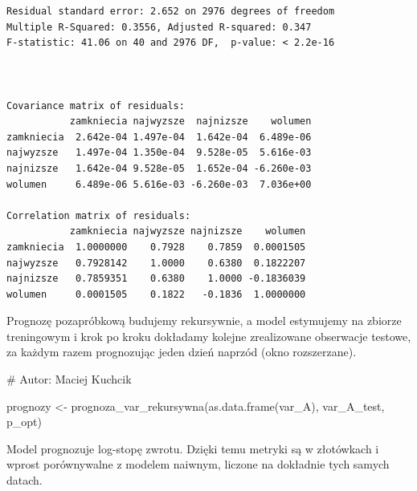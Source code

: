 \documentclass[
  polish,
  letterpaper,
  DIV=11,
  numbers=noendperiod]{scrartcl}
\newenvironment{Shaded}{\begin{snugshade}}{\end{snugshade}}
\newcommand{\CommentTok}[1]{\textcolor[rgb]{0.37,0.37,0.37}{#1}}
\newcommand{\FunctionTok}[1]{\textcolor[rgb]{0.28,0.35,0.67}{#1}}
\newcommand{\NormalTok}[1]{\textcolor[rgb]{0.00,0.23,0.31}{#1}}
\newcommand{\OtherTok}[1]{\textcolor[rgb]{0.00,0.23,0.31}{#1}}
\begin{document}
\begin{verbatim}
Residual standard error: 2.652 on 2976 degrees of freedom
Multiple R-Squared: 0.3556, Adjusted R-squared: 0.347 
F-statistic: 41.06 on 40 and 2976 DF,  p-value: < 2.2e-16 



Covariance matrix of residuals:
           zamkniecia najwyzsze  najnizsze    wolumen
zamkniecia  2.642e-04 1.497e-04  1.642e-04  6.489e-06
najwyzsze   1.497e-04 1.350e-04  9.528e-05  5.616e-03
najnizsze   1.642e-04 9.528e-05  1.652e-04 -6.260e-03
wolumen     6.489e-06 5.616e-03 -6.260e-03  7.036e+00

Correlation matrix of residuals:
           zamkniecia najwyzsze najnizsze    wolumen
zamkniecia  1.0000000    0.7928    0.7859  0.0001505
najwyzsze   0.7928142    1.0000    0.6380  0.1822207
najnizsze   0.7859351    0.6380    1.0000 -0.1836039
wolumen     0.0001505    0.1822   -0.1836  1.0000000
\end{verbatim}

Prognozę pozapróbkową budujemy rekursywnie, a model estymujemy na
zbiorze treningowym i krok po kroku dokładamy kolejne zrealizowane
obserwacje testowe, za każdym razem prognozując jeden dzień naprzód
(okno rozszerzane).

\begin{Shaded}
\begin{Highlighting}[]
\CommentTok{\# Autor: Maciej Kuchcik}

\NormalTok{prognozy }\OtherTok{\textless{}{-}} \FunctionTok{prognoza\_var\_rekursywna}\NormalTok{(}\FunctionTok{as.data.frame}\NormalTok{(var\_A), var\_A\_test, p\_opt)}
\end{Highlighting}
\end{Shaded}

Model prognozuje log-stopę zwrotu. Dzięki temu metryki są w złotówkach i
wprost porównywalne z modelem naiwnym, liczone na dokładnie tych samych
datach.
\end{document}
